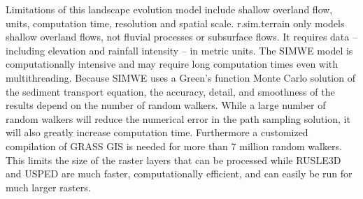 \documentclass[gmd, manuscript]{copernicus}
\begin{document}
Limitations of this landscape evolution model include
shallow overland flow, 
units, computation time, resolution and spatial scale.
r.sim.terrain only models shallow overland flows, 
not fluvial processes or subsurface flows. 
It requires data -- including 
elevation and rainfall intensity -- in metric units. 
The SIMWE model is computationally intensive 
and may require long computation times even with multithreading.
Because SIMWE uses a Green's function Monte Carlo solution 
of the sediment transport equation, 
the accuracy, detail, and smoothness of the results 
depend on the number of random walkers.
While a large number of random walkers will reduce the
numerical error in the path sampling solution,
it will also greatly increase computation time.
Furthermore a customized compilation of GRASS GIS 
is needed for more than 7 million random walkers.
This limits the size of the raster layers that can be processed
while RUSLE3D and USPED are much faster, computationally efficient,
and can easily be run for much larger rasters.
\end{document}
